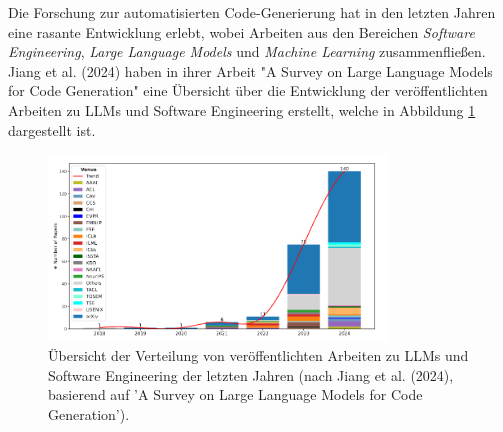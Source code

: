 \documentclass[11pt,a4paper]{article}
\begin{document}
Die Forschung zur automatisierten Code-Generierung hat in den letzten Jahren eine rasante Entwicklung erlebt, wobei Arbeiten aus den Bereichen \emph{Software Engineering}, \emph{Large Language Models} und \emph{Machine Learning} zusammenfließen. Jiang et al. (2024) haben in ihrer Arbeit "A Survey on Large Language Models for Code Generation" eine Übersicht über die Entwicklung der veröffentlichten Arbeiten zu LLMs und Software Engineering erstellt, welche in Abbildung \ref{fig:entwicklung_paper} dargestellt ist.
\begin{figure}[H]
    \centering
    \includegraphics[width=0.8\textwidth]{./bilder/entwicklung_paper.png}
    \caption{Übersicht der Verteilung von veröffentlichten Arbeiten zu LLMs und Software Engineering der letzten Jahren (nach Jiang et al. (2024), basierend auf 'A Survey on Large Language Models for Code Generation').}
    \label{fig:entwicklung_paper}
\end{figure}
\end{document}
